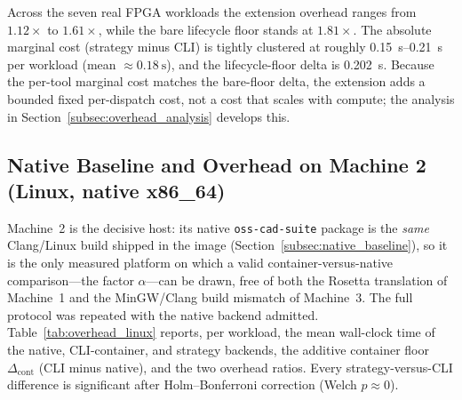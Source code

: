 Across the seven real FPGA workloads the extension overhead ranges from $1.12\times$ to $1.61\times$, while the bare lifecycle floor stands at $1.81\times$. The absolute marginal cost (strategy minus CLI) is tightly clustered at roughly \SIrange{0.15}{0.21}{\second} per workload (mean $\approx \SI{0.18}{\second}$), and the lifecycle-floor delta is \SI{0.202}{\second}. Because the per-tool marginal cost matches the bare-floor delta, the extension adds a bounded fixed per-dispatch cost, not a cost that scales with compute; the analysis in Section~\ref{subsec:overhead_analysis} develops this.

\subsection{Native Baseline and Overhead on Machine 2 (Linux, native x86\_64)}
\label{subsec:overhead_linux}
Machine~2 is the decisive host: its native \texttt{oss-cad-suite} package is the \emph{same} Clang/Linux build shipped in the image (Section~\ref{subsec:native_baseline}), so it is the only measured platform on which a valid container-versus-native comparison---the factor $\alpha$---can be drawn, free of both the Rosetta translation of Machine~1 and the MinGW/Clang build mismatch of Machine~3. The full protocol was repeated with the native backend admitted. Table~\ref{tab:overhead_linux} reports, per workload, the mean wall-clock time of the native, CLI-container, and strategy backends, the additive container floor $\Delta_{\mathrm{cont}}$ (CLI minus native), and the two overhead ratios. Every strategy-versus-CLI difference is significant after Holm--Bonferroni correction (Welch $p \approx 0$).

